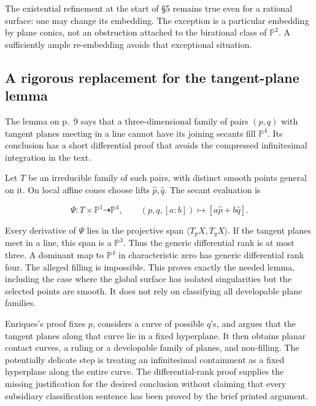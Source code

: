 The existential refinement at the start of §5 remains true even for a rational surface: one may change its embedding. The exception is a particular embedding by plane conics, not an obstruction attached to the birational class of \(\mathbb P^2\). A sufficiently ample re-embedding avoids that exceptional situation.

\subsection{A rigorous replacement for the tangent-plane lemma}

The lemma on p.~9 says that a three-dimensional family of pairs \((p,q)\) with tangent planes meeting in a line cannot have its joining secants fill \(\mathbb P^4\). Its conclusion has a short differential proof that avoids the compressed infinitesimal integration in the text.

Let \(T\) be an irreducible family of such pairs, with distinct smooth points general on it. On local affine cones choose lifts \(\widehat p,\widehat q\). The secant evaluation is

\[
\Psi:T\times\mathbb P^1\dashrightarrow\mathbb P^4,
\qquad(p,q,[a:b])\mapsto[a\widehat p+b\widehat q].
\]

Every derivative of \(\Psi\) lies in the projective span \(\langle T_pX,T_qX\rangle\). If the tangent planes meet in a line, this span is a \(\mathbb P^3\). Thus the generic differential rank is at most three. A dominant map to \(\mathbb P^4\) in characteristic zero has generic differential rank four. The alleged filling is impossible. This proves exactly the needed lemma, including the case where the global surface has isolated singularities but the selected points are smooth. It does not rely on classifying all developable plane families.

Enriques's proof fixes \(p\), considers a curve of possible \(q\)'s, and argues that the tangent planes along that curve lie in a fixed hyperplane. It then obtains planar contact curves, a ruling or a developable family of planes, and non-filling. The potentially delicate step is treating an infinitesimal containment as a fixed hyperplane along the entire curve. The differential-rank proof supplies the missing justification for the desired conclusion without claiming that every subsidiary classification sentence has been proved by the brief printed argument.

